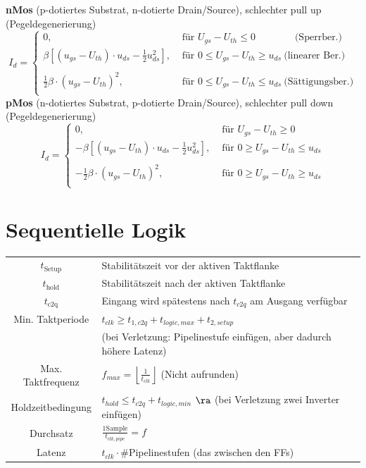 \documentclass[english]{latex4ei/latex4ei_sheet}
\begin{document}
\textbf{nMos} (p-dotiertes Substrat, n-dotierte Drain/Source), schlechter pull up (Pegeldegenerierung)
\begin{equation*}
\!\!\! I_d = \begin{cases}
0, &\text{ für }  U_{gs} - U_{th} \le 0 \qquad \qquad  \text{(Sperrber.)}\\[0.2em]
\beta [(u_{gs} - U_{th}) \cdot u_{ds} - \frac{1}{2} u_{ds}^2] , &\text{ für }  0 \le U_{gs} - U_{th} \ge u_{ds} \  \text{(linearer Ber.)}\\\\[0.2em]
\frac{1}{2} \beta \cdot (u_{gs} - U_{th})^2, &\text{ für }  0 \le U_{gs} - U_{th} \le u_{ds} \  \text{(Sättigungsber.)}\\
\end{cases}
\end{equation*}
\textbf{pMos} (n-dotiertes Substrat, p-dotierte Drain/Source), schlechter pull down (Pegeldegenerierung)
\begin{equation*}
\!\!\! I_d = \begin{cases}
0, &\text{ für }  U_{gs} - U_{th} \ge 0\\[0.2em]
- \beta [(u_{gs} - U_{th}) \cdot u_{ds} - \frac{1}{2} u_{ds}^2] , &\text{ für }  0 \ge U_{gs} - U_{th} \le u_{ds}\\\\[0.2em]
- \frac{1}{2} \beta \cdot (u_{gs} - U_{th})^2, &\text{ für }  0 \ge U_{gs} - U_{th} \ge u_{ds}\\

\end{cases}
\end{equation*}

\section{Sequentielle Logik}

\begin{tabular}{c|l}
	$t_{\text{Setup}}$ & Stabilitätszeit vor der aktiven Taktflanke\\
	$t_{\text{hold}}$ & Stabilitätszeit nach  der aktiven Taktflanke\\
	$t_{\text{c2q}}$ & Eingang wird spätestens nach $t_{c2q}$ am Ausgang verfügbar\\
	Min. Taktperiode &  $t_{clk} \ge t_{1,c2q} + t_{logic,max} + t_{2,setup}$ \\
	 & (bei Verletzung: Pipelinestufe einfügen, aber dadurch höhere Latenz) \\
	Max. Taktfrequenz & $f_{max} = \left\lfloor \frac{1}{t_{clk}} \right\rfloor$ \qquad (Nicht aufrunden) \\
	Holdzeitbedingung & $t_{hold} \le t_{c2q} + t_{logic,min}$  $\ra$ (bei Verletzung zwei Inverter einfügen)\\
	Durchsatz & $\frac{1 \text{Sample}}{t_{clk,pipe}} = f$ \\
	Latenz & $t_{clk} \cdot \#$Pipelinestufen (das zwischen den FFs) \\
\end{tabular}
\end{document}
